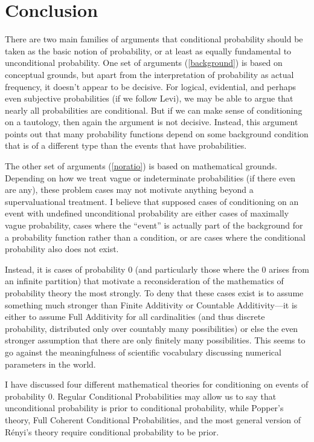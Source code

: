 \section{Conclusion}\label{conclusion}

There are two main families of arguments that conditional probability should be taken as the basic notion of probability, or at least as equally fundamental to unconditional probability. One set of arguments (\autoref{background}) is based on conceptual grounds, but apart from the interpretation of probability as actual frequency, it doesn't appear to be decisive. For logical, evidential, and perhaps even subjective probabilities (if we follow Levi), we may be able to argue that nearly all probabilities are conditional. But if we can make sense of conditioning on a tautology, then again the argument is not decisive. Instead, this argument points out that many probability functions depend on some background condition that is of a different type than the events that have probabilities.

The other set of arguments (\autoref{noratio}) is based on mathematical grounds. Depending on how we treat vague or indeterminate probabilities (if there even are any), these problem cases may not motivate anything beyond a supervaluational treatment. I believe that supposed cases of conditioning on an event with undefined unconditional probability are either cases of maximally vague probability, cases where the ``event'' is actually part of the background for a probability function rather than a condition, or are cases where the conditional probability also does not exist.

Instead, it is cases of probability $0$ (and particularly those where the $0$ arises from an infinite partition) that motivate a reconsideration of the mathematics of probability theory the most strongly. To deny that these cases exist is to assume something much stronger than Finite Additivity or Countable Additivity---it is either to assume Full Additivity for all cardinalities (and thus discrete probability, distributed only over countably many possibilities) or else the even stronger assumption that there are only finitely many possibilities. This seems to go against the meaningfulness of scientific vocabulary discussing numerical parameters in the world.

I have discussed four different mathematical theories for conditioning on events of probability $0$. Regular Conditional Probabilities may allow us to say that unconditional probability is prior to conditional probability, while Popper's theory, Full Coherent Conditional Probabilities, and the most general version of R\'{e}nyi's theory require conditional probability to be prior.

